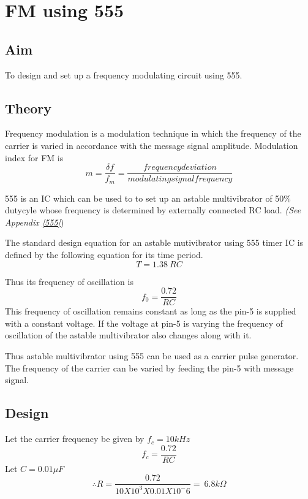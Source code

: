 \chapter[FM using 555]{FM using 555}

\section*{Aim}
To design and set up a frequency modulating circuit using 555.

\section*{Theory}
Frequency modulation is a modulation technique in which the frequency of the carrier is varied in accordance with the message signal amplitude.
Modulation index for FM is 
\begin{equation}
m= \frac{\delta f}{f_m}=\frac{frequency deviation}{modulating signal frequency}
\end{equation}

555 is an IC which can be used to to set up an astable multivibrator of 50\% dutycyle whose frequency is determined by externally connected RC load. \emph{(See Appendix \ref{555}})

\noindent The standard design equation for an astable mutivibrator using 555 timer IC is defined by the following equation for its time period.
\begin{equation}
T=1.38 \ RC
\end{equation}

\noindent Thus its frequency of oscillation is 
\begin{equation}
f_0 = \frac{0.72}{RC}
\end{equation}
This frequency of oscillation remains constant as long as the pin-5 is supplied with a constant voltage. If the voltage at pin-5 is varying the frequency of oscillation of the astable multivibrator also changes along with it.

Thus astable multivibrator using 555 can be used as a carrier pulse generator. The frequency of the carrier can be varied by feeding the pin-5 with message signal.
\section*{Design}
\noindent Let the carrier frequency be given by $f_c= 10 kHz$
\begin{equation}
f_c=\frac{0.72}{RC}
\end{equation}
\noindent Let $C=0.01 \mu F$
\begin{equation}
\therefore
R=\frac{0.72}{10X 10^3 X 0.01 X 10^-6}= \ 6.8 k\Omega
\end{equation}

